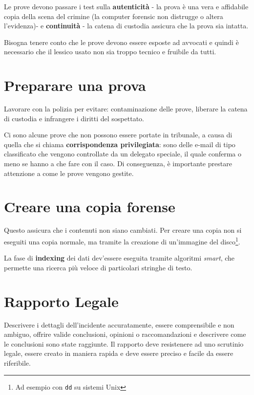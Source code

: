 Le prove devono passare i test sulla \textbf{autenticità} - la prova è una vera
e affidabile copia della scena del crimine (la computer forensic non distrugge
o altera l'evidenza)- e \textbf{continuità} - la catena di custodia assicura
che la prova sia intatta.

Bisogna tenere conto che le prove devono essere esposte ad avvocati
e quindi è necessario che il lessico usato non sia troppo tecnico e fruibile da tutti.

\section{Preparare una prova}

Lavorare con la polizia per evitare: contaminazione delle prove, liberare la
catena di custodia e infrangere i diritti del sospettato.

Ci sono alcune prove che non possono essere portate in tribunale, a causa di
quella che si chiama \textbf{corrispondenza privilegiata}: sono delle e-mail
di tipo classificato che vengono controllate da un delegato speciale, il quale
conferma o meno se hanno a che fare con il caso. Di conseguenza, è importante
prestare attenzione a come le prove vengono gestite.

\section{Creare una copia forense}

Questo assicura che i contenuti non siano cambiati. Per creare una copia non si
 eseguiti una copia normale, ma tramite la creazione di
un'immagine del disco\footnote{Ad esempio con \texttt{dd} su sistemi Unix}.

La fase di \textbf{indexing} dei dati dev'essere eseguita tramite algoritmi
\textit{smart}, che permette una ricerca più veloce di particolari stringhe di
testo.

\section{Rapporto Legale}

Descrivere i dettagli dell'incidente accuratamente, essere comprensibile e non
ambiguo, offrire valide conclusioni, opinioni o raccomandazioni e descrivere come
le conclusioni sono state raggiunte. Il rapporto deve resistenere ad uno scrutinio
legale, essere creato in maniera rapida e deve essere preciso e facile da essere
riferibile.

